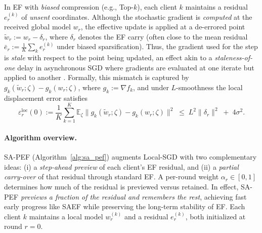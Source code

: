 \documentclass{article} %
\begin{document}
In EF with \emph{biased} compression (e.g., Top-$k$), each client $k$ maintains a residual $e_r^{(k)}$ of \emph{unsent} coordinates. Although the stochastic gradient is \emph{computed} at the received global model $w_r$, the effective update is applied at a de-errored point $\tilde w_r := w_r - \delta_r$, where $\delta_r$ denotes the EF carry (often close to the mean residual $\bar e_r := \tfrac1K\sum_k e_r^{(k)}$ under biased sparsification). Thus, the gradient used for the step is \emph{stale} with respect to the point being updated, an effect akin to a \emph{staleness-of-one} delay in asynchronous SGD where gradients are evaluated at one iterate but applied to another \citep{lian2015asynchronous}. Formally, this mismatch is captured by \(g_k(\tilde w_r;\zeta) - g_k(w_r;\zeta)\), where \(g_k := \nabla f_k\), and under $L$-smoothness the local displacement error satisfies
\[
\varepsilon_r^{\mathrm{loc}}(0)
:= \frac{1}{K}\sum_{k=1}^K \mathbb{E}_\zeta\!\big\|g_k(\tilde w_r;\zeta)-g_k(w_r;\zeta)\big\|^2
\;\le\; L^2\|\delta_r\|^2 \;+\; 4\sigma^2.
\]


\paragraph{Algorithm overview.} 
SA-PEF (Algorithm~\ref{alg:sa_pef}) augments Local-SGD with two complementary ideas: 
(i) a \emph{step-ahead preview} of each client’s EF residual, and 
(ii) a \emph{partial carry-over} of that residual through standard EF. 
A per-round weight $\alpha_r \in [0,1]$ determines how much of the residual is previewed versus retained. In effect, SA-PEF \emph{previews a fraction of the residual and remembers the rest}, achieving fast early progress like SAEF while preserving the long-term stability of EF. Each client $k$ maintains a local model $w_r^{(k)}$ and a residual $e_r^{(k)}$, both initialized at round $r=0$.
\end{document}
